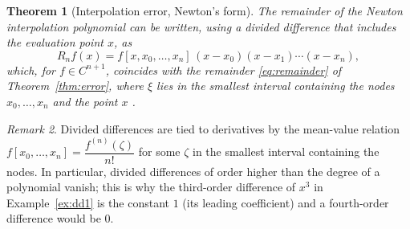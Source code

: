 \documentclass[12pt, a4paper]{article}
\theoremstyle{plain}
\newtheorem{theorem}{Theorem}[section]
\theoremstyle{definition}
\theoremstyle{remark}
\newtheorem{remark}[theorem]{Remark}
\begin{document}
\begin{theorem}[Interpolation error, Newton's form]\label{thm:newton-error}
The remainder of the Newton interpolation polynomial can be written, using a divided difference that includes the evaluation point $x$, as
\begin{equation}
    R_n f(x) = f[x, x_0, \dots, x_n]\,(x - x_0)(x - x_1) \cdots (x - x_n),
\end{equation}
which, for $f \in C^{n+1}$, coincides with the remainder \eqref{eq:remainder} of Theorem~\ref{thm:error}, where $\xi$ lies in the smallest interval containing the nodes $x_0, \dots, x_n$ and the point $x$ \cite{micula5}.
\end{theorem}

\begin{remark}
Divided differences are tied to derivatives by the mean-value relation $f[x_0,\dots,x_n] = \dfrac{f^{(n)}(\zeta)}{n!}$ for some $\zeta$ in the smallest interval containing the nodes. In particular, divided differences of order higher than the degree of a polynomial vanish; this is why the third-order difference of $x^3$ in Example~\ref{ex:dd1} is the constant $1$ (its leading coefficient) and a fourth-order difference would be $0$.
\end{remark}
\end{document}
